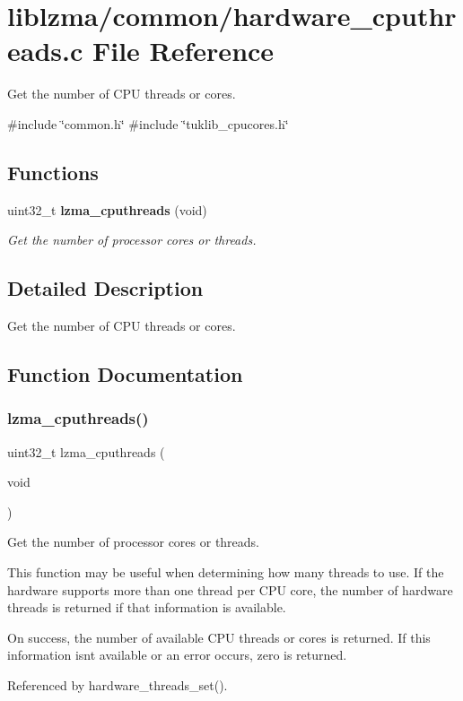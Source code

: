 \section{liblzma/common/hardware\+\_\+cputhreads.c File Reference}
\label{hardware__cputhreads_8c}


Get the number of C\+PU threads or cores.  


{\ttfamily \#include \char`\"{}common.\+h\char`\"{}}\newline
{\ttfamily \#include \char`\"{}tuklib\+\_\+cpucores.\+h\char`\"{}}\newline
\subsection*{Functions}
\begin{DoxyCompactItemize}
\item 
uint32\+\_\+t \textbf{ lzma\+\_\+cputhreads} (void)
\begin{DoxyCompactList}\small\item\em Get the number of processor cores or threads. \end{DoxyCompactList}\end{DoxyCompactItemize}


\subsection{Detailed Description}
Get the number of C\+PU threads or cores. 



\subsection{Function Documentation}
\mbox{\label{hardware__cputhreads_8c_a26d58f9e3f270fbdece4d64d8636d3d8}} 
\subsubsection{lzma\+\_\+cputhreads()}
{\footnotesize\ttfamily uint32\+\_\+t lzma\+\_\+cputhreads (\begin{DoxyParamCaption}\item[{void}]{ }\end{DoxyParamCaption})}



Get the number of processor cores or threads. 

This function may be useful when determining how many threads to use. If the hardware supports more than one thread per C\+PU core, the number of hardware threads is returned if that information is available.

On success, the number of available C\+PU threads or cores is returned. If this information isn\textquotesingle{}t available or an error occurs, zero is returned. 

Referenced by hardware\+\_\+threads\+\_\+set().

